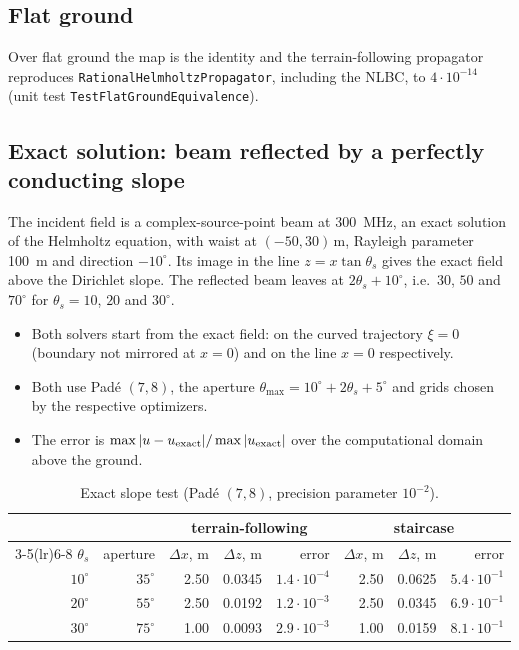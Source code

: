 \subsection{Flat ground}
Over flat ground the map is the identity and the terrain-following propagator
reproduces \texttt{RationalHelmholtzPropagator}, including the NLBC, to
$4\cdot10^{-14}$ (unit test \texttt{TestFlatGroundEquivalence}).
\subsection{Exact solution: beam reflected by a perfectly conducting slope}\label{sec:slope}
The incident field is a complex-source-point beam at \SI{300}{MHz}, an exact
solution of the Helmholtz equation, with waist at $(-50,30)$\,m, Rayleigh parameter
\SI{100}{m} and direction $-10^\circ$. Its image in the line $z=x\tan\theta_s$ gives
the exact field above the Dirichlet slope. The reflected beam leaves at
$2\theta_s+10^\circ$, i.e.\ $30$, $50$ and $70^\circ$ for $\theta_s=10$, $20$ and $30^\circ$.
\begin{itemize}
\item Both solvers start from the exact field: on the curved trajectory $\xi=0$
(boundary not mirrored at $x=0$) and on the line $x=0$ respectively.
\item Both use Pad\'e $(7,8)$, the aperture $\theta_{\max}=10^\circ+2\theta_s+5^\circ$
and grids chosen by the respective optimizers.
\item The error is $\max|u-u_{\rm exact}|/\max|u_{\rm exact}|$ over the computational
domain above the ground.
\end{itemize}
\begin{table}[h]\centering
\caption{Exact slope test (Pad\'e $(7,8)$, precision parameter $10^{-2}$).}\label{tab:slope}
\begin{tabular}{rrrrrrrr}\toprule
& & \multicolumn{3}{c}{terrain-following} & \multicolumn{3}{c}{staircase}\\
\cmidrule(lr){3-5}\cmidrule(lr){6-8}
$\theta_s$ & aperture & $\Delta x$, m & $\Delta z$, m & error & $\Delta x$, m & $\Delta z$, m & error\\\midrule
$10^\circ$ & $35^\circ$ & 2.50 & 0.0345 & $1.4\cdot10^{-4}$ & 2.50 & 0.0625 & $5.4\cdot10^{-1}$\\
$20^\circ$ & $55^\circ$ & 2.50 & 0.0192 & $1.2\cdot10^{-3}$ & 2.50 & 0.0345 & $6.9\cdot10^{-1}$\\
$30^\circ$ & $75^\circ$ & 1.00 & 0.0093 & $2.9\cdot10^{-3}$ & 1.00 & 0.0159 & $8.1\cdot10^{-1}$\\
\bottomrule\end{tabular}\end{table}
